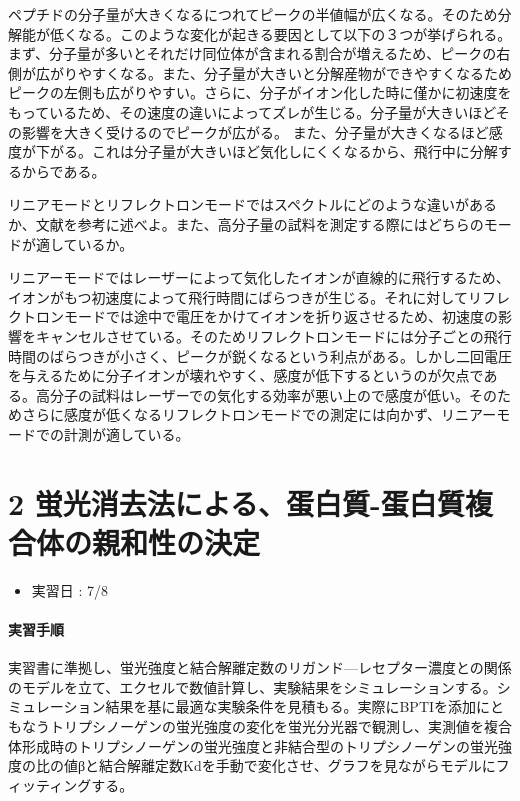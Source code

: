 \documentclass[a4paper,papersize,dvipdfmx]{jsarticle}
\begin{document}
\begin{enumerate}
ペプチドの分子量が大きくなるにつれてピークの半値幅が広くなる。そのため分解能が低くなる。このような変化が起きる要因として以下の３つが挙げられる。
まず、分子量が多いとそれだけ同位体が含まれる割合が増えるため、ピークの右側が広がりやすくなる。また、分子量が大きいと分解産物ができやすくなるためピークの左側も広がりやすい。さらに、分子がイオン化した時に僅かに初速度をもっているため、その速度の違いによってズレが生じる。分子量が大きいほどその影響を大きく受けるのでピークが広がる。
また、分子量が大きくなるほど感度が下がる。これは分子量が大きいほど気化しにくくなるから、飛行中に分解するからである。


\begin{tcolorbox}[colback=white,colbacktitle=black!10!white,coltitle=black,title={5}]
リニアモードとリフレクトロンモードではスペクトルにどのような違いがあるか、文献を参考に述べよ。また、高分子量の試料を測定する際にはどちらのモードが適しているか。
\end{tcolorbox}

リニアーモードではレーザーによって気化したイオンが直線的に飛行するため、イオンがもつ初速度によって飛行時間にばらつきが生じる。それに対してリフレクトロンモードでは途中で電圧をかけてイオンを折り返させるため、初速度の影響をキャンセルさせている。そのためリフレクトロンモードには分子ごとの飛行時間のばらつきが小さく、ピークが鋭くなるという利点がある。しかし二回電圧を与えるために分子イオンが壊れやすく、感度が低下するというのが欠点である。高分子の試料はレーザーでの気化する効率が悪い上ので感度が低い。そのためさらに感度が低くなるリフレクトロンモードでの測定には向かず、リニアーモードでの計測が適している。

\end{enumerate}
\part*{2 蛍光消去法による、蛋白質-蛋白質複合体の親和性の決定}

\begin{itemize}
\item 実習日 : 7/8

\end{itemize}
\subsection*{実習手順}

実習書に準拠し、蛍光強度と結合解離定数のリガンド—レセプター濃度との関係のモデルを立て、エクセルで数値計算し、実験結果をシミュレーションする。シミュレーション結果を基に最適な実験条件を見積もる。実際にBPTIを添加にともなうトリプシノーゲンの蛍光強度の変化を蛍光分光器で観測し、実測値を複合体形成時のトリプシノーゲンの蛍光強度と非結合型のトリプシノーゲンの蛍光強度の比の値βと結合解離定数Kdを手動で変化させ、グラフを見ながらモデルにフィッティングする。
\end{document}
